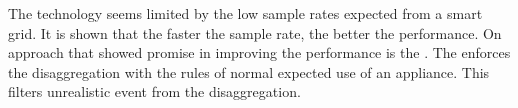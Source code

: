 The  technology seems limited by the low sample rates expected from a smart grid. It is shown that the faster the sample rate, the better the performance. On approach that showed promise in improving the performance is the . The  enforces the disaggregation with the rules of normal expected use of an appliance. This filters unrealistic event from the disaggregation. 